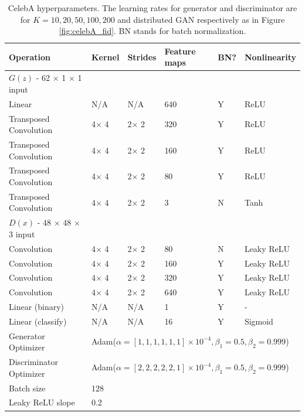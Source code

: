 \documentclass{article}
\begin{document}
\begin{table}[htbp]
\caption{CelebA hyperparameters. The learning rates for generator and discriminator are for $K=10,20,50,100,200$ and distributed GAN respectively as in Figure \ref{fig:celebA_fid}. BN stands for batch normalization.}
\centering
\begin{tabular}{llllll}
\hline 
Operation& Kernel &Strides &Feature maps & BN? & Nonlinearity\\
\hline 
$G(z)$ - 62 $\times$ 1 $\times$ 1 input  & & & & & \\
Linear & N/A & N/A&640 & Y & ReLU\\
Transposed Convolution &4$\times$ 4 & 2$\times$ 2 &320 & Y & ReLU\\
Transposed Convolution &4$\times$ 4 & 2$\times$ 2 &160 & Y & ReLU\\
Transposed Convolution &4$\times$ 4 & 2$\times$ 2 &80 & Y & ReLU\\
Transposed Convolution &4$\times$ 4 & 2$\times$ 2 &3 & N & Tanh\\
$D(x)$ - 48 $\times$ 48 $\times$ 3 input  & & & & & \\
Convolution &4$\times$ 4 & 2$\times$ 2 &80 & N & Leaky ReLU\\
Convolution &4$\times$ 4 & 2$\times$ 2 &160 & Y & Leaky ReLU\\
Convolution &4$\times$ 4 & 2$\times$ 2 &320 & Y & Leaky ReLU\\
Convolution &4$\times$ 4 & 2$\times$ 2 &640 & Y & Leaky ReLU\\
Linear (binary) & N/A & N/A&1 & Y &-\\
Linear (classify)& N/A & N/A&16 & Y &Sigmoid\\
Generator Optimizer &\multicolumn{5}{l}{Adam($\alpha=[1,1,1,1,1,1]\times 10^{-4}, \beta_1=0.5, \beta_2=0.999$)}\\
Discriminator Optimizer &\multicolumn{5}{l}{Adam($\alpha=[2,2,2,2,2,1]\times 10^{-4}, \beta_1=0.5, \beta_2=0.999$)}\\
Batch size &\multicolumn{5}{l}{128}\\
Leaky ReLU slope &\multicolumn{5}{l}{0.2}\\
\hline
\end{tabular}
\label{tab:celebA}
\end{table}
\end{document}
